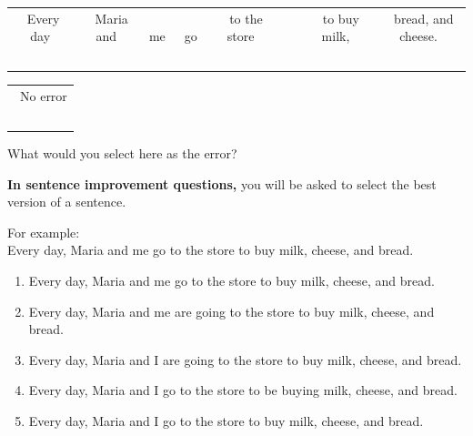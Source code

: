 \documentclass[12pt]{book}
\begin{document}
\begin{inparaenum}[A]
\begin{spacing}{1.25}
\begin{tabularx}{\textwidth}{*8{@{}>{\ }c}}
Every day & Maria and & me & go & to the store & \ & to buy milk, & bread, and cheese.  \\
\item &  &\item & & \item & &\item &  \\
\end{tabularx}

\begin{tabularx}{\textwidth}{*1{@{}>{\ }c}}
No error
\\
\item\\
\end{tabularx}

\end{spacing}

\end{inparaenum}

What would you select here as the error?

\bigskip

\bigskip

\bigskip

\bigskip

\bigskip

\textbf{In sentence improvement questions,} you will be asked to select the best version of a sentence.

\bigskip
For example:\\
Every day, Maria and me go to the store to buy milk, cheese, and bread.
\begin{enumerate}[label=(\Alph*)] \itemsep-0.4em
\item{Every day, Maria and me go to the store to buy milk, cheese, and bread.}
\item{Every day, Maria and me are going to the store to buy milk, cheese, and bread.}
\item{Every day, Maria and I are going to the store to buy milk, cheese, and bread.}
\item{Every day, Maria and I go to the store to be buying milk, cheese, and bread.}
\item{Every day, Maria and I go to the store to buy milk, cheese, and bread.}
\end{enumerate}
\end{document}
